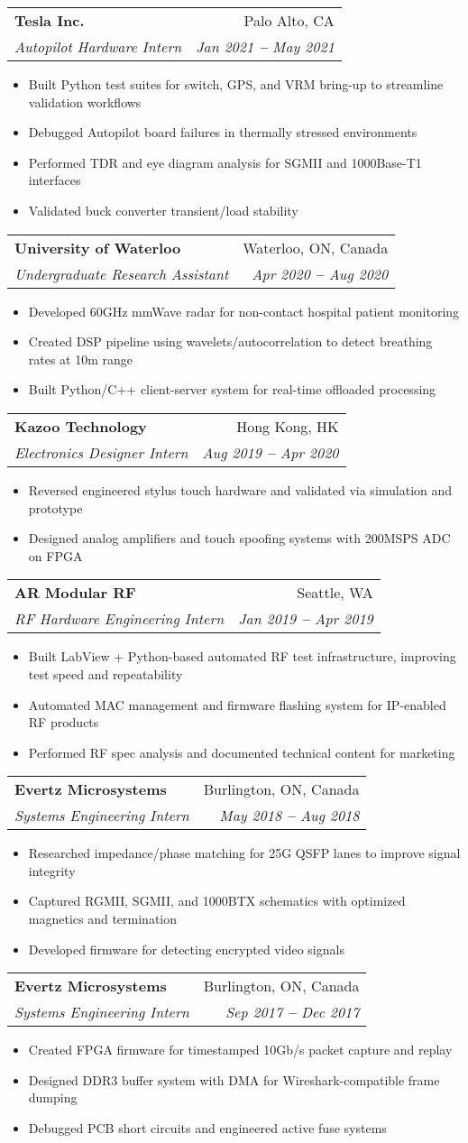 \documentclass[letterpaper,11pt]{article}
\makeatletter
\newcommand{\resumeItem}[1]{
  \item\small{
    {#1 \vspace{-2pt}}
  }
}
\newcommand{\resumeSubheading}[4]{
  \vspace{-2pt}\item
    \begin{tabular*}{0.97\textwidth}[t]{l@{\extracolsep{\fill}}r}
      \textbf{#1} & #2 \\
      \textit{\small#3} & \textit{\small #4} \\
    \end{tabular*}\vspace{-7pt}
}
\newcommand{\resumeItemListStart}{\begin{itemize}}
\newcommand{\resumeItemListEnd}{\end{itemize}\vspace{-5pt}}
\makeatother
\begin{document}
  \resumeSubheading
    {Tesla Inc.}{Palo Alto, CA}
    {Autopilot Hardware Intern}{Jan 2021 \textbf{--} May 2021}
    \resumeItemListStart
      \resumeItem{Built Python test suites for switch, GPS, and VRM bring-up to streamline validation workflows}
      \resumeItem{Debugged Autopilot board failures in thermally stressed environments}
      \resumeItem{Performed TDR and eye diagram analysis for SGMII and 1000Base-T1 interfaces}
      \resumeItem{Validated buck converter transient/load stability}
    \resumeItemListEnd

  \resumeSubheading
    {University of Waterloo}{Waterloo, ON, Canada}
    {Undergraduate Research Assistant}{Apr 2020 \textbf{--} Aug 2020}
    \resumeItemListStart
      \resumeItem{Developed 60GHz mmWave radar for non-contact hospital patient monitoring}
      \resumeItem{Created DSP pipeline using wavelets/autocorrelation to detect breathing rates at 10m range}
      \resumeItem{Built Python/C++ client-server system for real-time offloaded processing}
    \resumeItemListEnd

  \pagebreak

  \resumeSubheading
    {Kazoo Technology}{Hong Kong, HK}
    {Electronics Designer Intern}{Aug 2019 \textbf{--} Apr 2020}
    \resumeItemListStart
      \resumeItem{Reversed engineered stylus touch hardware and validated via simulation and prototype}
      \resumeItem{Designed analog amplifiers and touch spoofing systems with 200MSPS ADC on FPGA}
    \resumeItemListEnd

  \resumeSubheading
    {AR Modular RF}{Seattle, WA}
    {RF Hardware Engineering Intern}{Jan 2019 \textbf{--} Apr 2019}
    \resumeItemListStart
      \resumeItem{Built LabView + Python-based automated RF test infrastructure, improving test speed and repeatability}
      \resumeItem{Automated MAC management and firmware flashing system for IP-enabled RF products}
      \resumeItem{Performed RF spec analysis and documented technical content for marketing}
    \resumeItemListEnd

  \resumeSubheading
    {Evertz Microsystems}{Burlington, ON, Canada}
    {Systems Engineering Intern}{May 2018 \textbf{--} Aug 2018}
    \resumeItemListStart
      \resumeItem{Researched impedance/phase matching for 25G QSFP lanes to improve signal integrity}
      \resumeItem{Captured RGMII, SGMII, and 1000BTX schematics with optimized magnetics and termination}
      \resumeItem{Developed firmware for detecting encrypted video signals}
    \resumeItemListEnd

  \resumeSubheading
    {Evertz Microsystems}{Burlington, ON, Canada}
    {Systems Engineering Intern}{Sep 2017 \textbf{--} Dec 2017}
    \resumeItemListStart
      \resumeItem{Created FPGA firmware for timestamped 10Gb/s packet capture and replay}
      \resumeItem{Designed DDR3 buffer system with DMA for Wireshark-compatible frame dumping}
      \resumeItem{Debugged PCB short circuits and engineered active fuse systems}
    \resumeItemListEnd
\end{document}
